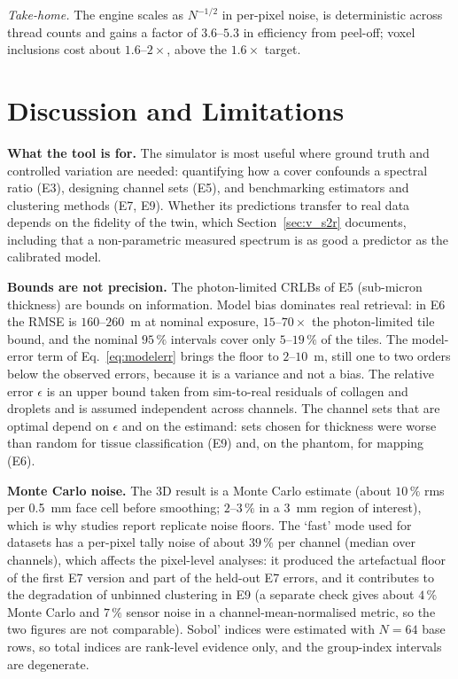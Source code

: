 \documentclass[journal]{IEEEtran}
\begin{document}
\emph{Take-home.} The engine scales as $N^{-1/2}$ in per-pixel noise, is deterministic across thread counts and gains a factor of $3.6$--$5.3$ in efficiency from peel-off; voxel inclusions cost about $1.6$--$2\times$, above the $1.6\times$ target.

\section{Discussion and Limitations}
\label{sec:limits}
\textbf{What the tool is for.} The simulator is most useful where ground truth and controlled variation are needed: quantifying how a cover confounds a spectral ratio (E3), designing channel sets (E5), and benchmarking estimators and clustering methods (E7, E9). Whether its predictions transfer to real data depends on the fidelity of the twin, which Section~\ref{sec:v_s2r} documents, including that a non-parametric measured spectrum is as good a predictor as the calibrated model.

\textbf{Bounds are not precision.} The photon-limited CRLBs of E5 (sub-micron thickness) are bounds on information. Model bias dominates real retrieval: in E6 the RMSE is $160$--$260$~\textmu m at nominal exposure, $15$--$70\times$ the photon-limited tile bound, and the nominal $95\,\%$ intervals cover only $5$--$19\,\%$ of the tiles. The model-error term of Eq.~\eqref{eq:modelerr} brings the floor to $2$--$10$~\textmu m, still one to two orders below the observed errors, because it is a variance and not a bias. The relative error $\epsilon$ is an upper bound taken from sim-to-real residuals of collagen and droplets and is assumed independent across channels. The channel sets that are optimal depend on $\epsilon$ and on the estimand: sets chosen for thickness were worse than random for tissue classification (E9) and, on the phantom, for mapping (E6).

\textbf{Monte Carlo noise.} The 3D result is a Monte Carlo estimate (about $10\,\%$ rms per 0.5~mm face cell before smoothing; $2$--$3\,\%$ in a 3~mm region of interest), which is why studies report replicate noise floors. The `fast' mode used for datasets has a per-pixel tally noise of about $39\,\%$ per channel (median over channels), which affects the pixel-level analyses: it produced the artefactual floor of the first E7 version and part of the held-out E7 errors, and it contributes to the degradation of unbinned clustering in E9 (a separate check gives about $4\,\%$ Monte Carlo and $7\,\%$ sensor noise in a channel-mean-normalised metric, so the two figures are not comparable). Sobol' indices were estimated with $N=64$ base rows, so total indices are rank-level evidence only, and the group-index intervals are degenerate.
\end{document}
